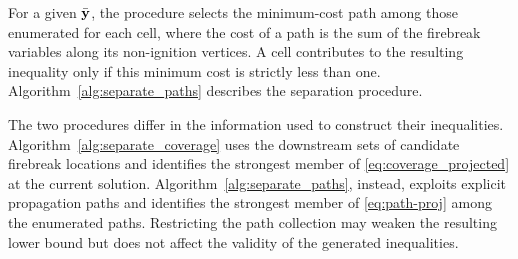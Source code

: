 \documentclass{itor}
\begin{document}
For a given $\bar{\vb{y}}$, the procedure selects the
minimum-cost path among those enumerated for each cell,
where the cost of a path is the sum of the firebreak
variables along its non-ignition vertices.
A cell contributes to the resulting inequality only if
this minimum cost is strictly less than one. Algorithm~\ref{alg:separate_paths} describes the separation
procedure.

The two procedures differ in the information used to
construct their inequalities. Algorithm~\ref{alg:separate_coverage}
uses the downstream sets of candidate firebreak locations
and identifies the strongest member of
\eqref{eq:coverage_projected} at the current solution.
Algorithm~\ref{alg:separate_paths}, instead, exploits
explicit propagation paths and identifies the strongest
member of \eqref{eq:path-proj} among the enumerated paths.
Restricting the path collection may weaken the resulting
lower bound but does not affect the validity of the
generated inequalities.
\end{document}
